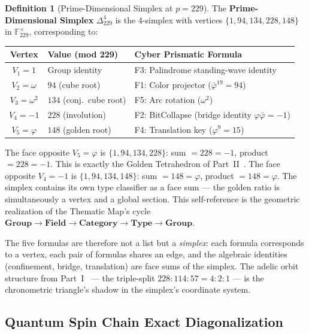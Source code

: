 \documentclass[12pt,oneside]{article}
\theoremstyle{principia}
\theoremstyle{definition}
\newtheorem{definition}[theorem]{Definition}
\theoremstyle{remark}
\providecommand{\FF}{\mathbb{F}}
\providecommand{\vp}{\varphi}
\providecommand{\vpbar}{\bar{\varphi}}
\begin{document}
\begin{definition}[Prime-Dimensional Simplex at $p = 229$]
The \textbf{Prime-Dimensional Simplex} $\Delta^4_{229}$ is the 4-simplex with vertices $\{1, 94, 134, 228, 148\}$ in $\FF_{229}^\times$, corresponding to:
\begin{center}
\begin{tabular}{@{}cll@{}}
\toprule
\textbf{Vertex} & \textbf{Value (mod 229)} & \textbf{Cyber Prismatic Formula} \\
\midrule
$V_1 = 1$ & Group identity & F3: Palindrome standing-wave identity \\
$V_2 = \omega$ & $94$ (cube root) & F1: Color projector ($\vpbar^{19} = 94$) \\
$V_3 = \omega^2$ & $134$ (conj.\ cube root) & F5: Arc rotation ($\omega^2$) \\
$V_4 = -1$ & $228$ (involution) & F2: BitCollapse (bridge identity $\vp\vpbar = -1$) \\
$V_5 = \vp$ & $148$ (golden root) & F4: Translation key ($\vp^9 = 15$) \\
\bottomrule
\end{tabular}
\end{center}
\end{definition}

The face opposite $V_5 = \vp$ is $\{1, 94, 134, 228\}$: sum $= 228 = -1$, product $= 228 = -1$. This is exactly the Golden Tetrahedron of Part~II~\cite{larue_chromatic}. The face opposite $V_4 = -1$ is $\{1, 94, 134, 148\}$: sum $= 148 = \vp$, product $= 148 = \vp$. The simplex contains its own type classifier as a face sum --- the golden ratio is simultaneously a vertex and a global section. This self-reference is the geometric realization of the Thematic Map's cycle $\textbf{Group} \to \textbf{Field} \to \textbf{Category} \to \textbf{Type} \to \textbf{Group}$.

The five formulas are therefore not a list but a \emph{simplex}: each formula corresponds to a vertex, each pair of formulas shares an edge, and the algebraic identities (confinement, bridge, translation) are face sums of the simplex. The adelic orbit structure from Part~I~\cite{dwm_fst} --- the triple-split $228:114:57 = 4:2:1$ --- is the chronometric triangle's shadow in the simplex's coordinate system.

\subsection{Quantum Spin Chain Exact Diagonalization}
\end{document}
